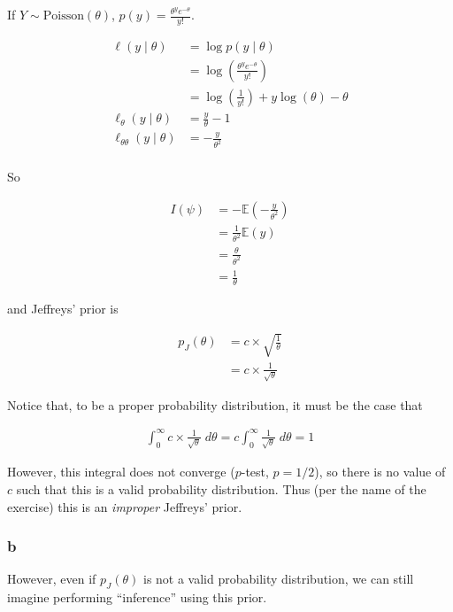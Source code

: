 \documentclass[
]{article}
\begin{document}
If \(Y \sim \text{Poisson}(\theta)\),
\(p(y) = \frac{\theta^y e^{-\theta}}{y!}\).

\begin{align}
\ell(y \mid \theta) &= \log p(y \mid \theta) \\
&= \log \left( \frac{\theta^y e^{-\theta}}{y!} \right) \\
&= \log \left( \frac{1}{y!} \right) + y \log (\theta) - \theta \\
\ell_\theta(y \mid \theta) &= \frac{y}{\theta} - 1\\
\ell_{\theta \theta}(y \mid \theta) &= -\frac{y}{\theta^2} \\
\end{align}

So

\begin{align}
I(\psi) &= -\mathbb{E}\left( - \frac{y}{\theta^2} \right) \\
&= \frac{1}{\theta^2} \mathbb{E}(y) \\
&= \frac{\theta}{\theta^2} \\
&= \frac{1}{\theta}
\end{align}

and Jeffreys' prior is

\begin{align}
p_J(\theta) &= c \times \sqrt{\frac{1}{\theta}} \\
&= c \times \frac{1}{\sqrt{\theta}}
\end{align}

Notice that, to be a proper probability distribution, it must be the
case that

\begin{align}
\int_0^{\infty} c \times \frac{1}{\sqrt{\theta}} \; d\theta = c \int_0^{\infty} \frac{1}{\sqrt{\theta}} \; d\theta = 1
\end{align}

However, this integral does not converge (\(p\)-test, \(p = 1/2\)), so
there is no value of \(c\) such that this is a valid probability
distribution. Thus (per the name of the exercise) this is an
\emph{improper} Jeffreys' prior.

\hypertarget{b-7}{%
\subsubsection{b}\label{b-7}}

However, even if \(p_J(\theta)\) is not a valid probability
distribution, we can still imagine performing ``inference'' using this
prior.
\end{document}
